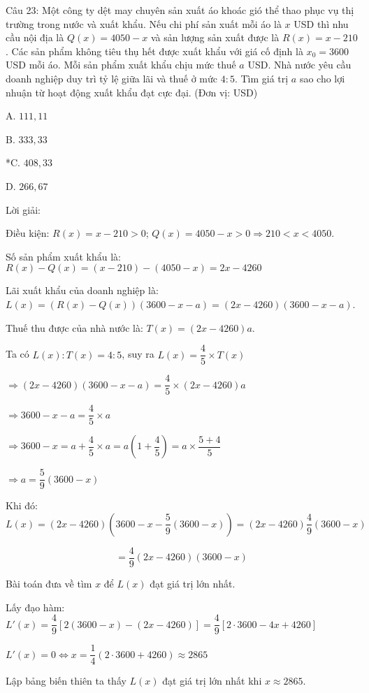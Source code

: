 \documentclass[a4paper,12pt]{article}
\begin{document}
Câu 23: Một công ty dệt may chuyên sản xuất áo khoác gió thể thao phục vụ thị trường trong nước và xuất khẩu. Nếu chi phí sản xuất mỗi áo là \(x\) USD thì nhu cầu nội địa là \(Q(x) = 4050 - x\) và sản lượng sản xuất được là \(R(x) = x - 210\). Các sản phẩm không tiêu thụ hết được xuất khẩu với giá cố định là \(x_0 = 3600\) USD mỗi áo. Mỗi sản phẩm xuất khẩu chịu mức thuế \(a\) USD. Nhà nước yêu cầu doanh nghiệp duy trì tỷ lệ giữa lãi và thuế ở mức \(4 : 5\). Tìm giá trị \(a\) sao cho lợi nhuận từ hoạt động xuất khẩu đạt cực đại. (Đơn vị: USD)

A. \(111,11\)

B. \(333,33\)

*C. \(408,33\)

D. \(266,67\)

Lời giải:


Điều kiện: \(R(x) = x - 210 > 0\); \(Q(x) = 4050 - x > 0 \Rightarrow 210 < x < 4050\).

Số sản phẩm xuất khẩu là: \(R(x) - Q(x) = (x - 210) - (4050 - x) = 2x - 4260\)

Lãi xuất khẩu của doanh nghiệp là: \(L(x) = (R(x) - Q(x))(3600 - x - a) = (2x - 4260)(3600 - x - a)\).

Thuế thu được của nhà nước là: \(T(x) = (2x - 4260)a\).

Ta có \(L(x) : T(x) = 4 : 5\), suy ra \(L(x) = \dfrac{4}{5} \times T(x)\)

\(\Rightarrow (2x - 4260)(3600 - x - a) = \dfrac{4}{5} \times (2x - 4260)a\)

\(\Rightarrow 3600 - x - a = \dfrac{4}{5} \times a\)

\(\Rightarrow 3600 - x = a + \dfrac{4}{5} \times a = a\left(1 + \dfrac{4}{5}\right) = a \times \dfrac{5 + 4}{5}\)

\(\Rightarrow a = \dfrac{5}{9}(3600 - x)\)

Khi đó:
$$L(x) = (2x - 4260)\left(3600 - x - \dfrac{5}{9}(3600 - x)\right) = (2x - 4260) \dfrac{4}{9}(3600 - x)$$

$$= \dfrac{4}{9}(2x - 4260)(3600 - x)$$

Bài toán đưa về tìm \(x\) để \(L(x)\) đạt giá trị lớn nhất.

Lấy đạo hàm: \(L'(x) = \dfrac{4}{9}[2(3600 - x) - (2x - 4260)] = \dfrac{4}{9}[2 \cdot 3600 - 4x + 4260]\)

\(L'(x) = 0 \Leftrightarrow x = \dfrac{1}{4}(2 \cdot 3600 + 4260) \approx 2865\)

Lập bảng biến thiên ta thấy \(L(x)\) đạt giá trị lớn nhất khi \(x \approx 2865\).
\end{document}
